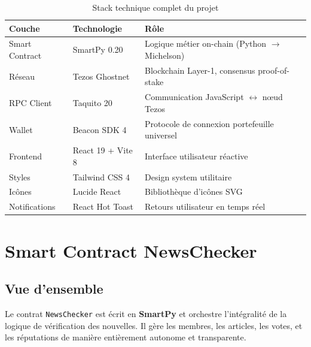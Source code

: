 \documentclass[12pt,a4paper]{article}
\newcommand{\smartpy}{\textcolor{accent}{\textbf{SmartPy}}}
\begin{document}
\begin{table}[H]
\centering
\renewcommand{\arraystretch}{1.4}
\begin{tabular}{L{3cm} L{3.5cm} L{6cm}}
\toprule
{}
\textbf{Couche} & \textbf{Technologie} & \textbf{Rôle} \\
\midrule
Smart Contract    & SmartPy 0.20     & Logique métier on-chain (Python $\to$ Michelson) \\
Réseau            & Tezos Ghostnet   & Blockchain Layer-1, consensus proof-of-stake \\
RPC Client        & Taquito 20       & Communication JavaScript $\leftrightarrow$ nœud Tezos \\
Wallet            & Beacon SDK 4     & Protocole de connexion portefeuille universel \\
Frontend          & React 19 + Vite 8 & Interface utilisateur réactive \\
Styles            & Tailwind CSS 4   & Design system utilitaire \\
Icônes            & Lucide React     & Bibliothèque d'icônes SVG \\
Notifications     & React Hot Toast  & Retours utilisateur en temps réel \\
\bottomrule
\end{tabular}
\caption{Stack technique complet du projet}
\end{table}

\section{Smart Contract NewsChecker}

\subsection{Vue d'ensemble}

Le contrat \texttt{NewsChecker} est écrit en \smartpy{} et orchestre l'intégralité de la logique de vérification des nouvelles. Il gère les membres, les articles, les votes, et les réputations de manière entièrement autonome et transparente.
\end{document}
